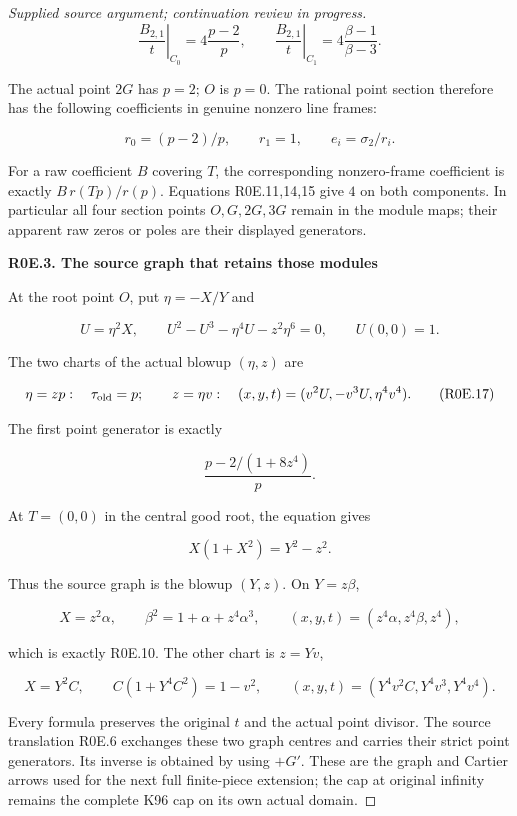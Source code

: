 \begin{proof}[Supplied source argument; continuation review in progress]
\[
 \left.\frac{B_{2,1}}t\right|_{C_0}
       =4\frac{p-2}{p},\qquad
 \left.\frac{B_{2,1}}t\right|_{C_1}
       =4\frac{\beta-1}{\beta-3}.
 \tag{R0E.14}
\]

The actual point \(2G\) has \(p=2\); \(O\) is \(p=0\).
The rational point section therefore has the following coefficients
in genuine nonzero line frames:

\[
 r_0=(p-2)/p,\qquad r_1=1,
 \qquad e_i=\sigma_2/r_i.
 \tag{R0E.15}
\]

For a raw coefficient \(B\) covering \(T\), the corresponding
nonzero-frame coefficient is exactly \(B\,r(Tp)/r(p)\).
Equations R0E.11,14,15 give \(4\) on both components. In particular
all four section points \(O,G,2G,3G\) remain in the module maps;
their apparent raw zeros or poles are their displayed generators.

\par

\medskip\noindent\textbf{R0E.3. The source graph that retains those modules}

\par\nobreak

At the root point \(O\), put \(\eta=-X/Y\) and

\[
 U=\eta^2X,\qquad
 U^2-U^3-\eta^4U-z^2\eta^6=0,\qquad U(0,0)=1.
 \tag{R0E.16}
\]

The two charts of the actual blowup \((\eta,z)\) are

\[
 \eta=zp:\quad\tau_{\rm old}=p;
 \qquad z=\eta v:\quad
 (x,y,t)=(v^2U,-v^3U,\eta^4v^4).
 \tag{R0E.17}
\]

The first point generator is exactly

\[
 \frac{p-2/(1+8z^4)}p.
 \tag{R0E.18}
\]

At \(T=(0,0)\) in the central good root, the equation gives

\[
 X(1+X^2)=Y^2-z^2.
 \tag{R0E.19}
\]

Thus the source graph is the blowup \((Y,z)\). On \(Y=z\beta\),

\[
 X=z^2\alpha,\qquad
 \beta^2=1+\alpha+z^4\alpha^3,
 \qquad (x,y,t)=(z^4\alpha,z^4\beta,z^4),
 \tag{R0E.20}
\]

which is exactly R0E.10. The other chart is \(z=Yv\),

\[
 X=Y^2C,\qquad C(1+Y^4C^2)=1-v^2,
 \qquad(x,y,t)=(Y^4v^2C,Y^4v^3,Y^4v^4).
 \tag{R0E.21}
\]

Every formula preserves the original \(t\) and the actual point
divisor. The source translation R0E.6 exchanges these two graph
centres and carries their strict point generators. Its inverse is
obtained by using \(+G'\). These are the graph and Cartier arrows
used for the next full finite-piece extension; the cap at original
infinity remains the complete K96 cap on its own actual domain.


\end{proof}
